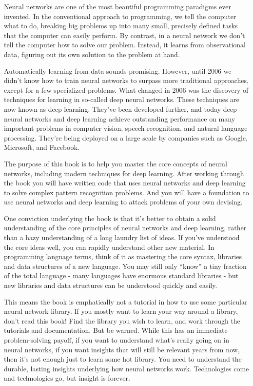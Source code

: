 
Neural networks are one of the most beautiful programming paradigms ever invented. In the conventional approach to programming, we tell the computer what to do, breaking big problems up into many small, precisely defined tasks that the computer can easily perform. By contrast, in a neural network we don't tell the computer how to solve our problem. Instead, it learns from observational data, figuring out its own solution to the problem at hand.


Automatically learning from data sounds promising. However, until 2006 we didn't know how to train neural networks to surpass more traditional approaches, except for a few specialized problems. What changed in 2006 was the discovery of techniques for learning in so-called deep neural networks. These techniques are now known as deep learning. They've been developed further, and today deep neural networks and deep learning achieve outstanding performance on many important problems in computer vision, speech recognition, and natural language processing. They're being deployed on a large scale by companies such as Google, Microsoft, and Facebook.


The purpose of this book is to help you master the core concepts of neural networks, including modern techniques for deep learning. After working through the book you will have written code that uses neural networks and deep learning to solve complex pattern recognition problems. And you will have a foundation to use neural networks and deep learning to attack problems of your own devising.





One conviction underlying the book is that it's better to obtain a solid understanding of the core principles of neural networks and deep learning, rather than a hazy understanding of a long laundry list of ideas. If you've understood the core ideas well, you can rapidly understand other new material. In programming language terms, think of it as mastering the core syntax, libraries and data structures of a new language. You may still only ``know'' a tiny fraction of the total language - many languages have enormous standard libraries - but new libraries and data structures can be understood quickly and easily.


This means the book is emphatically not a tutorial in how to use some particular neural network library. If you mostly want to learn your way around a library, don't read this book! Find the library you wish to learn, and work through the tutorials and documentation. But be warned. While this has an immediate problem-solving payoff, if you want to understand what's really going on in neural networks, if you want insights that will still be relevant years from now, then it's not enough just to learn some hot library. You need to understand the durable, lasting insights underlying how neural networks work. Technologies come and technologies go, but insight is forever.



